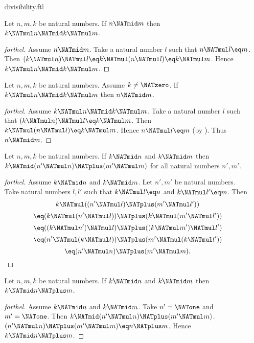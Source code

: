 \documentclass{naproche-library}
\begin{document}
\begin{smodule}[title=Divisibility]{divisibility.ftl}
\begin{proposition}[forthel,id=ARITHMETIC_07_1283495225720832]
  Let $n, m, k$ be natural numbers.
  If $n \NATmid m$ then $k \NATmul n \NATmid k \NATmul m$.
\end{proposition}
\begin{proof}[forthel]
  Assume $n \NATmid m$.
  Take a natural number $l$ such that $n \NATmul l \eq m$.
  Then $(k \NATmul n) \NATmul l
    \eq k \NATmul (n \NATmul l)
    \eq k \NATmul m$.
  Hence $k \NATmul n \NATmid k \NATmul m$.
\end{proof}

\begin{proposition}[forthel,id=ARITHMETIC_07_6469492028735488]
  Let $n, m, k$ be natural numbers.
  Assume $k \neq \NATzero$.
  If $k \NATmul n \NATmid k \NATmul m$ then $n \NATmid m$.
\end{proposition}
\begin{proof}[forthel]
  Assume $k \NATmul n \NATmid k \NATmul m$.
  Take a natural number $l$ such that $(k \NATmul n) \NATmul l \eq k \NATmul m$.
  Then $k \NATmul (n \NATmul l) \eq k \NATmul m$.
  Hence $n \NATmul l \eq m$ (by ).
  Thus $n \NATmid m$.
\end{proof}

\begin{proposition}[forthel,id=ARITHMETIC_07_4700711333920768]
  Let $n, m, k$ be natural numbers.
  If $k \NATmid n$ and $k \NATmid m$ then $k \NATmid (n' \NATmul n) \NATplus (m' \NATmul m)$
  for all natural numbers $n', m'$.
\end{proposition}
\begin{proof}[forthel]
  Assume $k \NATmid n$ and $k \NATmid m$.
  Let $n', m'$ be natural numbers.
  Take natural numbers $l,l'$ such that $k \NATmul l \eq n$ and $k \NATmul l' \eq m$.
  Then
  \[  k \NATmul ((n' \NATmul l) \NATplus (m' \NATmul l'))                \]
  \[    \eq (k \NATmul (n' \NATmul l)) \NATplus (k \NATmul (m' \NATmul l'))  \]
  \[    \eq ((k \NATmul n') \NATmul l) \NATplus ((k \NATmul m') \NATmul l')  \]
  \[    \eq (n' \NATmul (k \NATmul l)) \NATplus (m' \NATmul (k \NATmul l'))  \]
  \[    \eq (n' \NATmul n) \NATplus (m' \NATmul m).                      \]
\end{proof}

\begin{corollary}[forthel,id=ARITHMETIC_07_1556786209357824]
  Let $n, m, k$ be natural numbers.
  If $k \NATmid n$ and $k \NATmid m$ then $k \NATmid n \NATplus m$.
\end{corollary}
\begin{proof}[forthel]
  Assume $k \NATmid n$ and $k \NATmid m$.
  Take $n' = \NATone$ and $m' = \NATone$.
  Then $k \NATmid (n' \NATmul n) \NATplus (m' \NATmul m)$.
  $(n' \NATmul n) \NATplus (m' \NATmul m) \eq n \NATplus m$.
  Hence $k \NATmid n \NATplus m$.
\end{proof}


\end{smodule}
\end{document}
